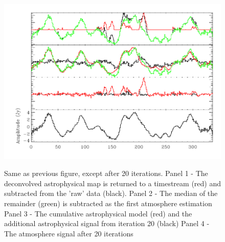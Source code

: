 \documentclass[12pt,preprint]{aastex}
\begin{document}
\begin{figure}
  \begin{minipage}{6.5in} \begin{center}
    \includegraphics[scale=0.9]{f6c}%

    \caption{Same as previous figure, except after 20 iterations.
    Panel 1 - The deconvolved astrophysical map is returned to a
    timestream (red) and subtracted from the 'raw' data (black).
    Panel 2 - The median of the remainder (green) is subtracted as the
    first atmosphere estimation Panel 3 - The cumulative astrophysical
    model (red) and the additional astrophysical signal from iteration
    20 (black) Panel 4 - The atmosphere signal after 20 iterations}

    \end{center}
    
    \label{fig:IterativeMapping-c} \end{minipage}
\end{figure}

\renewcommand{\thefigure}{\arabic{figure}}
\end{document}

